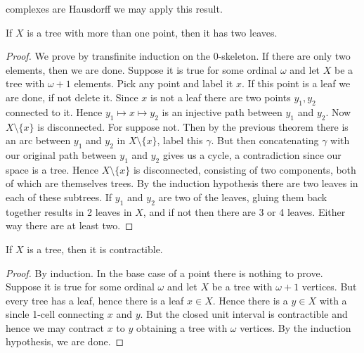         complexes are Hausdorff we may apply this result.
        \begin{theorem}
            If $X$ is a tree with more than one point, then it has two
            leaves.
        \end{theorem}
        \begin{proof}
            We prove by transfinite induction on the 0-skeleton. If
            there are only two elements, then we are done. Suppose it is
            true for some ordinal $\omega$ and let $X$ be a tree with
            $\omega+1$ elements. Pick any point and label it $x$. If
            this point is a leaf we are done, if not delete it. Since
            $x$ is not a leaf there are two points $y_{1},y_{2}$
            connected to it. Hence $y_{1}\mapsto{x}\mapsto{y}_{2}$ is an
            injective path between $y_{1}$ and $y_{2}$. Now
            $X\setminus\{x\}$ is disconnected. For suppose not. Then by
            the previous theorem there is an arc between $y_{1}$ and
            $y_{2}$ in $X\setminus\{x\}$, label this $\gamma$. But then
            concatenating $\gamma$ with our original path between
            $y_{1}$ and $y_{2}$ gives us a cycle, a contradiction since
            our space is a tree. Hence $X\setminus\{x\}$ is
            disconnected, consisting of two components, both of which
            are themselves trees. By the induction hypothesis there are
            two leaves in each of these subtrees. If $y_{1}$ and $y_{2}$
            are two of the leaves, gluing them back together results in
            2 leaves in $X$, and if not then there are 3 or 4 leaves.
            Either way there are at least two.
        \end{proof}
        \begin{theorem}
            If $X$ is a tree, then it is contractible.
        \end{theorem}
        \begin{proof}
            By induction. In the base case of a point there is nothing
            to prove. Suppose it is true for some ordinal $\omega$ and
            let $X$ be a tree with $\omega+1$ vertices. But every tree
            has a leaf, hence there is a leaf $x\in{X}$. Hence there is
            a $y\in{X}$ with a sincle 1-cell connecting $x$ and $y$. But
            the closed unit interval is contractible and hence we may
            contract $x$ to $y$ obtaining a tree with $\omega$ vertices.
            By the induction hypothesis, we are done.
        \end{proof}
